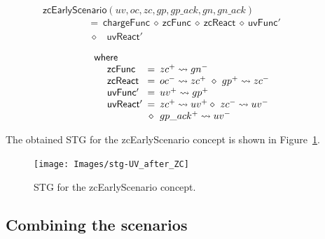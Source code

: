 \documentclass[british, journal]{IEEEtran}
\begin{document}
\vspace{-4mm}
\[
\mathsf{zcEarlyScenario}(uv,oc,zc,gp,gp\_ack,gn,gn\_ack)~~~~~~~~~~~~~~~~~~~~~~~~~~~~~~~
\]
\vspace{-5mm}
\[
\begin{array}{lcl}
~~=~\mathsf{chargeFunc}~\diamond~\mathsf{zcFunc}~\diamond~\mathsf{zcReact}~\diamond~\mathsf{uvFunc'}\\
~~~\!\diamond~~~~\!\!\mathsf{uvReact'}\\
\end{array}
\]
\vspace{-4mm}
\[
\begin{array}{lcl}
\mathsf{where}&~&\\

~~~~\mathsf{zcFunc}&\hspace{-2mm}=&\hspace{-2mm}zc^{+}\rightsquigarrow gn^{-}\\
~~~~\mathsf{zcReact}&\hspace{-2mm}=&\hspace{-2mm}oc^{-}\rightsquigarrow zc^{+}~\diamond~gp^{+}\rightsquigarrow zc^{-}\\
~~~~\mathsf{uvFunc'}&\hspace{-2mm}=&\hspace{-2mm}uv^{+}\rightsquigarrow gp^{+}\\
~~~~\mathsf{uvReact'}&\hspace{-2mm}=&\hspace{-2mm}zc^{+}\rightsquigarrow uv^{+}
\diamond~zc^{-}\rightsquigarrow uv^{-}\\
&\hspace{-2mm}\diamond&\hspace{-2mm}gp\_ack^{+}\rightsquigarrow uv^{-}

\end{array}
\]

The obtained STG for the \textsf{zcEarlyScenario} concept is shown
in Figure~\ref{fig:zcEarlyScenario STG}.

\begin{figure}[H]
\begin{centering}
\texttt{[image: Images/stg-UV\_after\_ZC]}
\par\end{centering}
\protect\caption{\label{fig:zcEarlyScenario STG}STG for the \textsf{zcEarlyScenario} concept.}
\vspace{-3mm}
\end{figure}

\subsection{Combining the scenarios }
\end{document}
